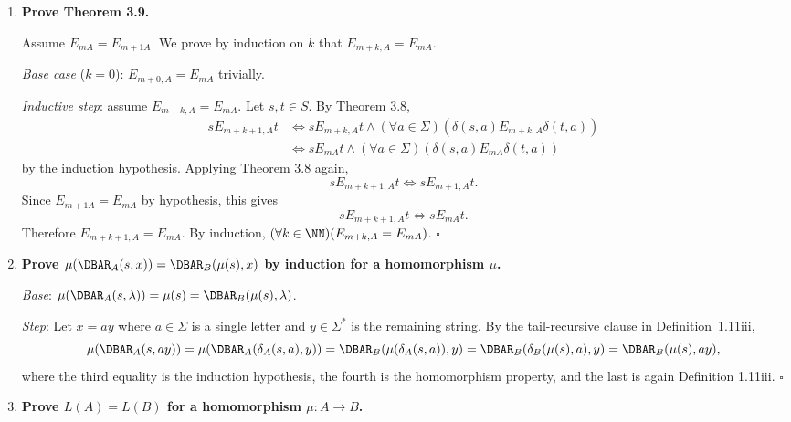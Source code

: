 \begin{enumerate}[{3.}1.]
By definition,
\[
sE_{0A}t \Leftrightarrow (\forall x\in\Sigma^* \ni |x|\leq 0)(\DBAR(s,x)\in F \Leftrightarrow \DBAR(t,x)\in F).
\]
The only string of length $0$ is $\lambda$, so
\[
sE_{0A}t \Leftrightarrow \DBAR(s,\lambda)\in F \Leftrightarrow \DBAR(t,\lambda)\in F
\Leftrightarrow s\in F \Leftrightarrow t\in F.
\]
Therefore the equivalence classes of $E_{0A}$ are exactly $F$ and $S-F$, unless one of these sets is empty, in which case there is only the single class $S$. $\square$

\item \textbf{Prove Theorem 3.9.}

Assume $E_{mA}=E_{m+1A}$. We prove by induction on $k$ that
$E_{m+k,A}=E_{mA}$.

\textit{Base case} ($k=0$): $E_{m+0,A}=E_{mA}$ trivially.

\textit{Inductive step}: assume $E_{m+k,A}=E_{mA}$. Let $s,t\in S$. By Theorem
3.8,
\begin{align*}
sE_{m+k+1,A}t
&\Leftrightarrow sE_{m+k,A}t \wedge
(\forall a\in\Sigma)(\delta(s,a)E_{m+k,A}\delta(t,a)) \\
&\Leftrightarrow sE_{mA}t \wedge
(\forall a\in\Sigma)(\delta(s,a)E_{mA}\delta(t,a))
\end{align*}
by the induction hypothesis. Applying Theorem 3.8 again,
\[
sE_{m+k+1,A}t \Leftrightarrow sE_{m+1,A}t.
\]
Since $E_{m+1A}=E_{mA}$ by hypothesis, this gives
\[
sE_{m+k+1,A}t \Leftrightarrow sE_{mA}t.
\]
Therefore $E_{m+k+1,A}=E_{mA}$. By induction,
$(\forall k\in\NN)(E_{m+k,A}=E_{mA})$. $\square$

\item \textbf{Prove $\mu(\DBAR_A(s,x))=\DBAR_B(\mu(s),x)$ by induction for a homomorphism $\mu$.}

\textit{Base}: $\mu(\DBAR_A(s,\lambda))=\mu(s)=\DBAR_B(\mu(s),\lambda)$. \checkmark

\textit{Step}: Let $x=ay$ where $a\in\Sigma$ is a single letter and
$y\in\Sigma^*$ is the remaining string. By the tail-recursive clause in
Definition~1.11iii,
\[
\mu(\DBAR_A(s,ay))
=\mu(\DBAR_A(\delta_A(s,a),y))
=\DBAR_B(\mu(\delta_A(s,a)),y)
=\DBAR_B(\delta_B(\mu(s),a),y)
=\DBAR_B(\mu(s),ay),
\]
where the third equality is the induction hypothesis, the fourth is the homomorphism property, and the last is again Definition 1.11iii. $\square$

\item \textbf{Prove $L(A)=L(B)$ for a homomorphism $\mu: A\to B$.}


\end{enumerate}
